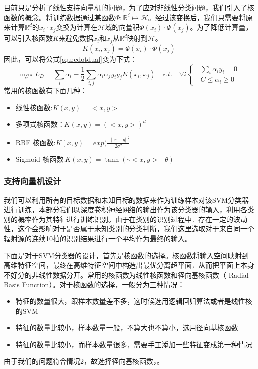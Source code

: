目前只是分析了线性支持向量机的问题，为了应对非线性分类问题，我们引入了核函数的概念。将训练数据通过某函数$\Phi:\mathbb{R}^d\mapsto\mathcal{H}$。经过该变换后，我们只需要将原来计算$\mathbb{R}^d$的$x_i\cdot x_j$变换为计算在$\mathcal{H}$域的向量积$\Phi(x_i)\cdot\Phi(x_j)$。为了降低计算量，可以引入核函数$K$来避免数据$x_i$和$x_j$从$\mathbb{R}^d$映射到$\mathcal{H}$。
\begin{equation}
	K(x_i,x_j)=\Phi(x_i)\cdot\Phi(x_j)
\end{equation}
因此，可以将公式\ref{equ:cdotdual}变为下式：
\begin{equation}
	\max \limits_{\alpha} L_D=\sum_i{\alpha_i}-\frac{1}{2}\sum_{i,j}\alpha_i\alpha_jy_iy_j K(x_i,x_j)\quad s.t. \quad \forall i 
	\left\{
		\begin{aligned}
	   &\sum_i{\alpha_iy_i}=0  \\
	   &C \leq \alpha_i \geq 0
	   \end{aligned}
		\right.
\end{equation}
常用的核函数有下面几种：
\begin{itemize}
	\item 线性核函数:$K(x,y)=<x,y>$
	\item 多项式核函数：$K(x,y)=(<x,y>)^d$
	\item RBF 核函数:$K(x,y)=exp(\frac{-||x-y||^2}{2\sigma^2}$
	\item Sigmoid 核函数:$K(x,y)=\tanh(\gamma<x,y>-\theta)$
\end{itemize}
\subsubsection{支持向量机设计}
我们可以利用所有的目标数据和未知目标的数据来作为训练样本对该SVM分类器进行训练，本部分我们以深度卷积神经网络的输出作为该分类器的输入，利用各类别的概率作为其特征进行训练识别。由于在类别的识别过程中，存在一定的波动性，这个会影响对于是否属于未知类别的分类判断，我们这里选取对于来自同一个辐射源的连续10拍的识别结果进行一个平均作为最终的输入。

下面是对于SVM分类器的设计，首先是核函数的选择。核函数将输入空间映射到高维特征空间，最终在高维特征空间中构造出最优分离超平面，从而把平面上本身不好分的非线性数据分开。常用的核函数为线性核函数和径向基核函数（ Radial Basis Function）。对于核函数的选择，一般分为三种情况：
\begin{itemize}
	\item  特征的数量很大，跟样本数量差不多，这时候选用逻辑回归算法或者是线性核的SVM
	\item  特征的数量比较小，样本数量一般，不算大也不算小，选用径向基核函数
	\item  特征的数量比较小，而样本数量很多，需要手工添加一些特征变成第一种情况
\end{itemize}
由于我们的问题符合情况2，故选择径向基核函数，。

